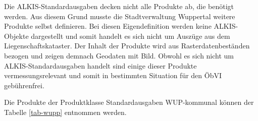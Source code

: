 Die ALKIS-Standardausgaben decken nicht alle Produkte ab, die benötigt werden. Aus diesem Grund musste die Stadtverwaltung Wuppertal weitere Produkte selbst definieren.
Bei diesen Eigendefinition werden keine ALKIS-Objekte dargestellt und somit handelt es sich nicht um Auszüge aus dem Liegenschaftskataster.
Der Inhalt der Produkte wird aus Rasterdatenbeständen bezogen und zeigen demnach Geodaten mit Bild.
Obwohl es sich nicht um ALKIS-Standardausgaben handelt sind einige dieser Produkte vermessungsrelevant und somit in bestimmten Situation für den ÖbVI gebührenfrei.

Die Produkte der Produktklasse Standardausgaben WUP-kommunal können der Tabelle \ref{tab-wupp} entnommen werden.


